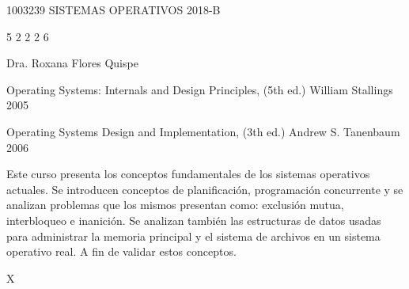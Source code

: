 \documentclass[12pt]{article}
\begin{document}
\sylabusHeader
\sylabusTitle

\curso
{1003239} %
{SISTEMAS OPERATIVOS} %
{2018-B} %

\creditosHoras
{5} %
{2} %
{2} %
{} %
{2} %
{6} %

\instructor
{Dra. Roxana Flores Quispe}



\libro
{Operating Systems: Internals and Design Principles, (5th ed.)} %
{William Stallings} %
{2005} %




\libroSecundario
{Operating Systems Design and Implementation, (3th ed.)} %
{Andrew S. Tanenbaum} %
{2006} %

\begin{datosCurso}
    \begin{descripcion}
      Este curso presenta los conceptos fundamentales de los sistemas operativos actuales. Se introducen conceptos de planificación,  programación  concurrente  y  se analizan  problemas  que  los  mismos  presentan  como:  exclusión  mutua, interbloqueo  e  inanición.  Se  analizan  también  las  estructuras  de  datos  usadas  para  administrar  la  memoria principal  y  el  sistema  de  archivos  en  un  sistema  operativo  real.  A  fin  de  validar  estos  conceptos.
      

        
    \end{descripcion}
    \begin{requisitos}
        
    \end{requisitos}
    \ObligatorioElectivo
    {X} %
    {} %
\end{datosCurso}
\end{document}
